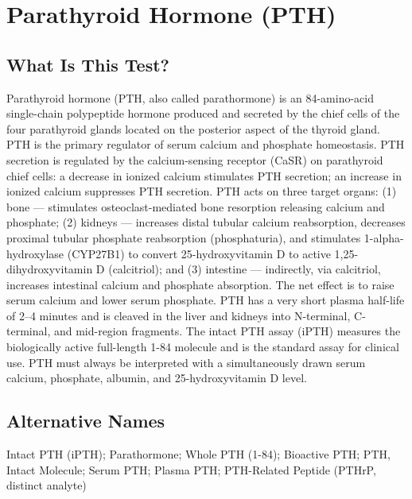 \chapter{Parathyroid Hormone (PTH)}

\section*{What Is This Test?}
Parathyroid hormone (PTH, also called parathormone) is an 84-amino-acid single-chain polypeptide hormone produced and secreted by the chief cells of the four parathyroid glands located on the posterior aspect of the thyroid gland. PTH is the primary regulator of serum calcium and phosphate homeostasis. PTH secretion is regulated by the calcium-sensing receptor (CaSR) on parathyroid chief cells: a decrease in ionized calcium stimulates PTH secretion; an increase in ionized calcium suppresses PTH secretion. PTH acts on three target organs: (1) bone --- stimulates osteoclast-mediated bone resorption releasing calcium and phosphate; (2) kidneys --- increases distal tubular calcium reabsorption, decreases proximal tubular phosphate reabsorption (phosphaturia), and stimulates 1-alpha-hydroxylase (CYP27B1) to convert 25-hydroxyvitamin D to active 1,25-dihydroxyvitamin D (calcitriol); and (3) intestine --- indirectly, via calcitriol, increases intestinal calcium and phosphate absorption. The net effect is to raise serum calcium and lower serum phosphate. PTH has a very short plasma half-life of 2--4 minutes and is cleaved in the liver and kidneys into N-terminal, C-terminal, and mid-region fragments. The intact PTH assay (iPTH) measures the biologically active full-length 1-84 molecule and is the standard assay for clinical use. PTH must always be interpreted with a simultaneously drawn serum calcium, phosphate, albumin, and 25-hydroxyvitamin D level.

\section*{Alternative Names}
Intact PTH (iPTH); Parathormone; Whole PTH (1-84); Bioactive PTH; PTH, Intact Molecule; Serum PTH; Plasma PTH; PTH-Related Peptide (PTHrP, distinct analyte)

